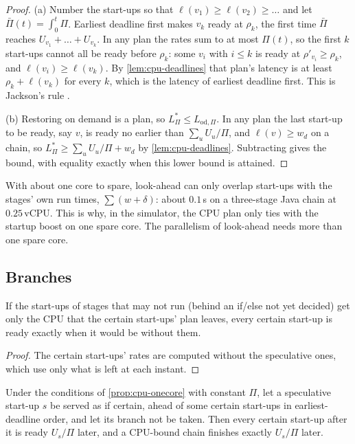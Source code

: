 \begin{proof}
(a) Number the start-ups so that $\ell(v_1) \ge \ell(v_2) \ge \dots$ and let
$\bar\Pi(t) = \int_0^t \Pi$. Earliest deadline first makes $v_k$ ready at $\rho_k$, the first time $\bar\Pi$
reaches $U_{v_1} + \dots + U_{v_k}$. In any plan the rates sum to at most $\Pi(t)$, so the first $k$
start-ups cannot all be ready before $\rho_k$: some $v_i$ with $i \le k$ is ready at
$\rho'_{v_i} \ge \rho_k$, and $\ell(v_i) \ge \ell(v_k)$. By \cref{lem:cpu-deadlines} that plan's
latency is at least $\rho_k + \ell(v_k)$ for every $k$, which is the latency of earliest
deadline first. This is Jackson's rule \cite{jackson1955}.

(b) Restoring on demand is a plan, so $L^*_\Pi \le L_{\mathrm{od},\Pi}$. In any plan the last
start-up to be ready, say $v$, is ready no earlier than $\sum_u U_u / \Pi$, and $\ell(v) \ge w_d$ on
a chain, so $L^*_\Pi \ge \sum_u U_u / \Pi + w_d$ by \cref{lem:cpu-deadlines}. Subtracting gives the
bound, with equality exactly when this lower bound is attained.
\end{proof}

With about one core to spare, look-ahead can only overlap start-ups with the stages' own run
times, $\sum (w + \delta)$: about $0.1$\,s on a three-stage Java chain at $0.25$\,vCPU. This is
why, in the simulator, the CPU plan only ties with the startup boost on one spare core.
The parallelism of look-ahead needs more than one spare core.

\subsection{Branches}

\begin{proposition}
\label{prop:cpu-spec}
If the start-ups of stages that may not run (behind an if/else not yet decided) get only the CPU
that the certain start-ups' plan leaves, every certain start-up is ready exactly when it would be
without them.
\end{proposition}

\begin{proof}
The certain start-ups' rates are computed without the speculative ones, which use only what is
left at each instant.
\end{proof}

\begin{proposition}
\label{prop:cpu-wrong}
Under the conditions of \cref{prop:cpu-onecore} with constant $\Pi$, let a speculative start-up $s$
be served as if certain, ahead of some certain start-ups in earliest-deadline order, and let its
branch not be taken. Then every certain start-up after it is ready $U_s / \Pi$ later, and a
CPU-bound chain finishes exactly $U_s / \Pi$ later.
\end{proposition}

